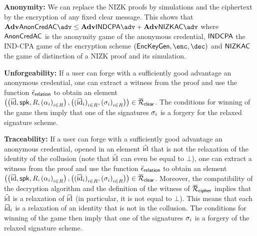 \begin{compactitem} 
\item \textbf{Anonymity:} We can replace the NIZK 
proofs by simulations and the ciphertext by the encryption of any
	fixed clear message. This shows that
	$\Adv{\ProbAnomCredAC}{\adv} \leq \Adv{\ProbCPAEnc}{\adv} + 
\Adv{\ProbNIZKAC}{\adv}$
	where $\mathsf{AnonCredAC}$ is the anonymity game of the anonymous 
credential, $\textsf{INDCPA}$ the
	IND-CPA game of the encryption scheme $(\EncKeyGen, \Enc, \Dec)$ 
and $\mathsf{NIZKAC}$ the game of distinction of a NIZK proof and its 
simulation.

\item \textbf{Unforgeability:} If a user can forge with a sufficiently good 
advantage an anonymous
	credential, one can extract a witness from the proof and use the 
function
	$\bar{\epsilon}_{\mathsf{relation}}$ to obtain an element 
$\left(\left(\baridentity, \spk, R, {(\alpha_i)}_{i \in R}\right),
		      \left({(\baridentity_i)}_{i \in R}, 
{(\signature_i)}_{i \in R}\right)\right)
	      \in \barrelationclear$. The conditions for winning of the 
game then imply that one of
	      the signatures $\sigma_i$ is a forgery for the relaxed 
signature scheme.


      \item \textbf{Traceability:} If a user can forge with a sufficiently good 
advantage an anonymous credential, opened in an element 
$\tilde{\text{id}}$ that is not the relaxation of the identity of the 
collusion (note that $\tilde{\text{id}}$ can even be equal to 
$\bot$), one can extract a witness from the proof and use
the function
	$\bar{\epsilon}_{\mathsf{relation}}$ to obtain an element 
$\left(\left(\baridentity, \spk, R, {(\alpha_i)}_{i \in R}\right),
		      \left({(\baridentity_i)}_{i \in R}, 
{(\signature_i)}_{i \in R}\right)\right)
	      \in \barrelationclear$.  Moreover, the compatibility of 
the decryption algorithm and the definition of the witness of
	$\barrelationcipher$ implies that $\tilde{\text{id}}$ is a 
relaxation of $\baridentity$ (in particular, it is not equal to $\bot$).
	      This means that each $\baridentity_i$ is a relaxation of 
an identity that is not
	      in the collusion. The conditions for winning of the game then
imply that one of the
	      signatures $\sigma_i$ is a forgery of the relaxed 
signature scheme. \end{compactitem}


\iffalse
\begin{verbatim}
    _.~"(_.~"(_.~"(_.~"(_.~"(

    copier-coller depuis new_version_article le début de la section 4, avant 4.1 ?
copier-coller l'annexe K dans une annexe qui va sauter ?

Notes:

* Éric m'a parlé de l'annexe I page 55, mais pas la place ? 

Olivier: Mis le main... le reste bleh
\end{verbatim}
\fi
